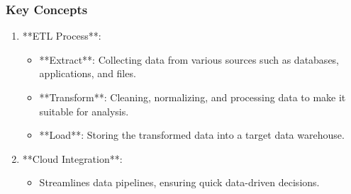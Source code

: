 \documentclass[aspectratio=169]{beamer}
\begin{document}
\begin{frame}[fragile]
    \frametitle{Key Concepts}
    \begin{enumerate}
        \item **ETL Process**:
            \begin{itemize}
                \item **Extract**: Collecting data from various sources such as databases, applications, and files.
                \item **Transform**: Cleaning, normalizing, and processing data to make it suitable for analysis.
                \item **Load**: Storing the transformed data into a target data warehouse.
            \end{itemize}
        \item **Cloud Integration**:
            \begin{itemize}
                \item Streamlines data pipelines, ensuring quick data-driven decisions.
            \end{itemize}
    \end{enumerate}
\end{frame}
\end{document}
